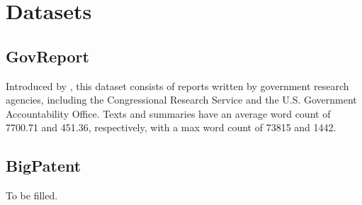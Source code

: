 \section{Datasets}


\subsection*{GovReport}

Introduced by \citet{huang-etal-2021-efficient}, this dataset consists of
reports written by government research agencies, including the Congressional
Research Service and the U.S. Government Accountability Office.
Texts and summaries have an average word count of 7700.71 and 451.36,
respectively, with a max word count of 73815 and 1442.


\subsection*{BigPatent}

To be filled.
